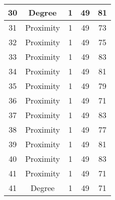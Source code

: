 \documentclass[results.tex]{subfiles}
\begin{document}
\begin{center}
\begin{tabular}{| c || c | c | c | c |}
            \hline
            30                      & Degree                       & 1                      & 49                      & 81                   \\
            \hline
            31                      & Proximity                    & 1                      & 49                      & 73                   \\
            \hline
            32                      & Proximity                    & 1                      & 49                      & 75                   \\
            \hline
            33                      & Proximity                    & 1                      & 49                      & 83                   \\
            \hline
            34                      & Proximity                    & 1                      & 49                      & 81                   \\
            \hline
            35                      & Proximity                    & 1                      & 49                      & 79                   \\
            \hline
            36                      & Proximity                    & 1                      & 49                      & 71                   \\
            \hline
            37                      & Proximity                    & 1                      & 49                      & 83                   \\
            \hline
            38                      & Proximity                    & 1                      & 49                      & 77                   \\
            \hline
            39                      & Proximity                    & 1                      & 49                      & 81                   \\
            \hline
            40                      & Proximity                    & 1                      & 49                      & 83                   \\
            \hline
            41                      & Proximity                    & 1                      & 49                      & 71                   \\
            \hline
            41                      & Degree                       & 1                      & 49                      & 71                   \\

\end{tabular}
\end{center}
\end{document}
